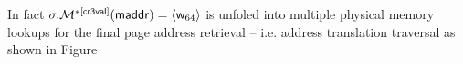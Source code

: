 In fact $\sigma.\mathcal{M}^{*[\mathsf{cr3val}]}(\mathsf{maddr})=\langle\mathsf{w}_{64}\rangle$ is unfoled into multiple physical memory lookups for the final page address retrieval -- i.e. address translation traversal as shown in Figure   

